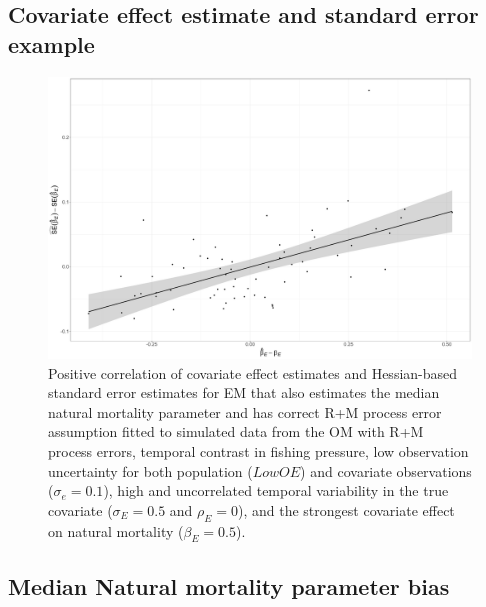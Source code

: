 \documentclass[
  12pt,
]{article}
\begin{document}
\hypertarget{covariate-effect-estimate-and-standard-error-example}{%
\subsection*{Covariate effect estimate and standard error example}\label{covariate-effect-estimate-and-standard-error-example}}

\begin{landscape}
\begin{figure}
\begin{center}
\includegraphics[height = \textheight]{om_69_em_5_beta_E_se_beta_E_lm_plot}
\end{center}
\caption{Positive correlation of covariate effect estimates and Hessian-based standard error estimates for EM that also estimates the median natural mortality parameter and has correct R+M process error assumption fitted to simulated data from the OM with R+M process errors, temporal contrast in fishing pressure, low observation uncertainty for both population ($Low OE$) and covariate observations ($\sigma_e = 0.1$), high and uncorrelated temporal variability in the true covariate ($\sigma_E = 0.5$ and $\rho_E = 0$), and the strongest covariate effect on natural mortality ($\beta_E = 0.5$).}\label{ex_lm_beta_E_SE_beta_E}
\end{figure}
\end{landscape}

\hypertarget{median-natural-mortality-parameter-bias}{%
\subsection*{Median Natural mortality parameter bias}\label{median-natural-mortality-parameter-bias}}
\end{document}
